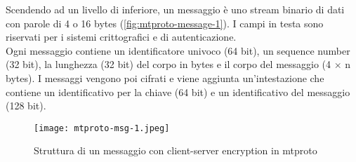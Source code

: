Scendendo ad un livello di inferiore, un messaggio è uno stream binario di dati con parole di 4 o 16 bytes (\autoref{fig:mtproto-message-1}).
I campi in testa sono riservati per i sistemi crittografici e di autenticazione. \\
Ogni messaggio contiene un identificatore univoco (64 bit), un sequence number (32 bit), la lunghezza (32 bit) del corpo in bytes e il corpo del messaggio (4 $\times$ n bytes).
I messaggi vengono poi cifrati e viene aggiunta un'intestazione che contiene un identificativo per la chiave (64 bit) e un identificativo del messaggio (128 bit). \\

\begin{figure}[!h]
    \texttt{[image: mtproto-msg-1.jpeg]}
    \caption{Struttura di un messaggio con client-server encryption in \gls{mtproto} \cite{man:mtproto}} \label{fig:mtproto-message-1}
\end{figure}

